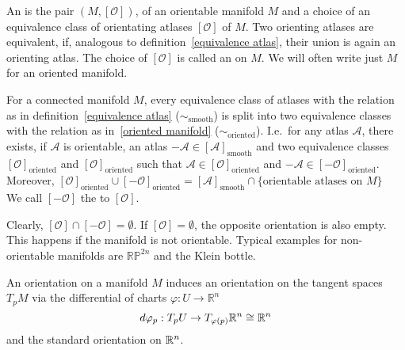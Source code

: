 \documentclass[a4paper,12pt]{article}
\begin{document}

\begin{definition}\label{oriented manifold}%
    An  is the pair \((M,[\mathcal{O}])\), of an orientable manifold \(M\) and a choice of an equivalence class of orientating atlases \([\mathcal{O}]\) of \(M\). 
    Two orienting atlases are equivalent, if, analogous to definition\ \ref{equivalence atlas}, their union is again an orienting atlas. 
    The choice of \([\mathcal{O}]\) is called an  on \(M\).
    We will often write just \(M\) for an oriented manifold.
\end{definition}

\begin{observation}
    For a connected manifold \(M\), every equivalence class of atlases with the relation as in definition\ \ref{equivalence atlas} (\(\sim_{\text{smooth}}\)) is split into two equivalence classes with the relation as in\ \ref{oriented manifold} (\(\sim_{\text{oriented}}\)). 
    I.e.\ for any atlas \(\mathcal{A}\), there exists, 
    if \(\mathcal{A}\) is orientable, 
    an atlas \(-\mathcal{A}\in[\mathcal{A}]_{\text{smooth}}\) and two equivalence classes 
    \([\mathcal{O}]_\text{oriented}\) and \([\mathcal{O}]_{\text{oriented}}\) such that 
    \(\mathcal{A}\in[\mathcal{O}]_\text{oriented}\) and \(-\mathcal{A}\in[-\mathcal{O}]_\text{oriented}\). \\
    Moreover, \([\mathcal{O}]_\text{oriented}\cup[-\mathcal{O}]_\text{oriented}=[\mathcal{A}]_\text{smooth}\cap\{\text{orientable atlases on }M\}\)\\
    We call \([-\mathcal{O}]\) the  to \([\mathcal{O}]\).
\end{observation}

\begin{remark}
    Clearly, \([\mathcal{O}]\cap[-\mathcal{O}]=\emptyset\). If \([\mathcal{O}]=\emptyset\), the opposite orientation is also empty. This happens if the manifold is not orientable. Typical examples for non-orientable manifolds are \(\mathbb{RP}^{2n}\) and the Klein bottle.
\end{remark}

An orientation on a manifold \(M\) induces an orientation on the tangent spaces \(T_p M\) via the differential of charts \(\varphi:U\to\mathbb{R}^n\)
\[d\varphi_p:T_p U\to T_{\varphi(p)}\mathbb{R}^n\cong\mathbb{R}^n\]
and the standard orientation on \(\mathbb{R}^n\).
\end{document}

